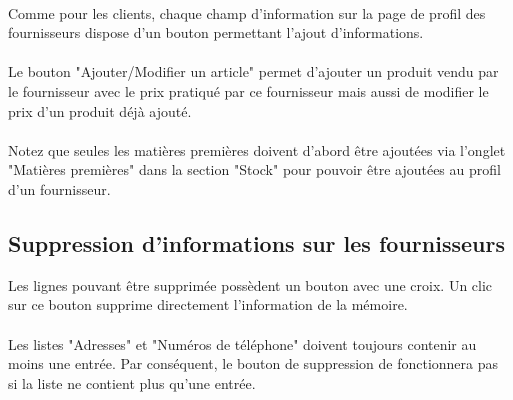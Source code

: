 \paragraph{}
Comme pour les clients, chaque champ d'information sur la page de profil
des fournisseurs dispose
d'un bouton permettant l'ajout d'informations.

\paragraph{}
Le bouton "Ajouter/Modifier un article" permet d'ajouter un produit vendu par le
fournisseur avec le prix pratiqué par ce fournisseur mais aussi de modifier le
prix d'un produit déjà ajouté.

\paragraph{}
Notez que seules les matières premières doivent
d'abord être ajoutées via l'onglet "Matières premières" dans la section "Stock"
pour pouvoir être ajoutées au profil d'un fournisseur.

\subsection{Suppression d'informations sur les fournisseurs}
Les lignes pouvant être supprimée possèdent
un bouton avec une croix. Un clic sur ce bouton supprime directement
l'information de la mémoire.

\paragraph{}
Les listes "Adresses" et "Numéros de téléphone" doivent toujours contenir au
moins une entrée. Par conséquent, le bouton de suppression de fonctionnera pas
si la liste ne contient plus qu'une entrée.
